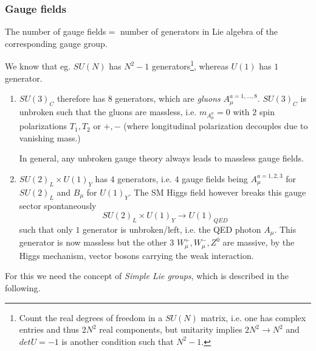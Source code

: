  \subsubsection{Gauge fields}
 \begin{statements}
 	The number of gauge fields$=$ number of generators in Lie algebra of the corresponding gauge group.
 \end{statements}
We know that eg. $SU(N)$ has $N^2-1$ generators\footnote{Count the real degrees of freedom in a $SU(N)$ matrix, i.e. one has complex entries and thus $2 N^2$ real components, but unitarity implies $2 N^2\rightarrow N^2$ and $detU=-1$ is another condition such that $N^2-1$. }, whereas $U(1)$ has $1$ generator. 
\begin{enumerate}
	\item $SU(3)_C$ therefore has $8$ generators, which are \emph{gluons} $A^{a=1,\dots,8}_\mu$. $SU(3)_C$ is unbroken such that the gluons are massless, i.e. $m_{A^a_\mu}=0$ with $2$ spin polarizations $T_1,T_2$ or $+,-$ (where longitudinal polarization decouples due to vanishing mass.)
	\begin{statements}
		In general, any unbroken gauge theory always leads to massless gauge fields.
	\end{statements}
\item $SU(2)_L \times U(1)_Y$ has $4$ generators, i.e. $4$ gauge fields being $A^{a=1,2,3}_\mu$ for $SU(2)_L$ and $B_\mu$ for $U(1)_Y$. The SM Higgs field however breaks this gauge sector spontaneously 
\begin{equation*}
	SU(2)_L\times U(1)_Y \longrightarrow U(1)_{QED}
\end{equation*}
such that only $1$ generator is unbroken/left, i.e. the QED photon $A_\mu$. This generator is now massless but the other $3$ $W^+_\mu,W^-_\mu,Z^0$ are massive, by the Higgs mechanism, vector bosons carrying the weak interaction.
\end{enumerate}
For this we need the concept of \emph{Simple Lie groups}, which is described in the following.
